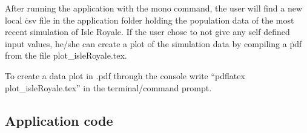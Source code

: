 \documentclass[a4paper]{report}
\begin{document}
After running the application with the mono command, the user will find a new local \.csv file in the application folder holding the population data of the most recent simulation of Isle Royale. If the user chose to not give any self defined input values, he/she can create a plot of the simulation data by compiling a \.pdf from the file plot\_isleRoyale.tex.

To create a data plot in .pdf through the console write “pdflatex plot\_isleRoyale.tex” in the terminal/command prompt.

\subsection{Application code}
\lstset{language=FSharp}

\end{document}
